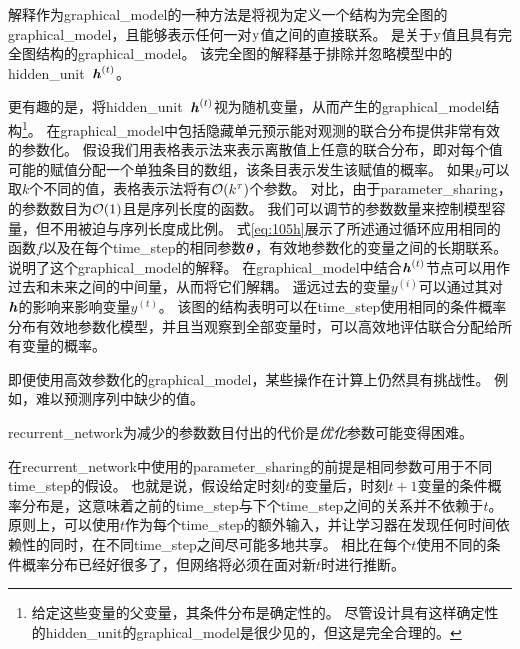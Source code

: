 解释作为\gls{graphical_model}的一种方法是将视为定义一个结构为完全图的\gls{graphical_model}，且能够表示任何一对$\mathrm{y}$值之间的直接联系。
是关于$\mathrm{y}$值且具有完全图结构的\gls{graphical_model}。
该完全图的解释基于排除并忽略模型中的\gls{hidden_unit}~$\boldsymbol{\mathit{h}}^{(t)}$。


更有趣的是，将\gls{hidden_unit}~$\boldsymbol{\mathit{h}}^{(t)}$视为随机变量，从而产生的\gls{graphical_model}结构\footnote{给定这些变量的父变量，其条件分布是确定性的。
尽管设计具有这样确定性的\gls{hidden_unit}的\gls{graphical_model}是很少见的，但这是完全合理的。}。
在\gls{graphical_model}中包括隐藏单元预示能对观测的联合分布提供非常有效的参数化。
假设我们用表格表示法来表示离散值上任意的联合分布，即对每个值可能的赋值分配一个单独条目的数组，该条目表示发生该赋值的概率。
如果$y$可以取$k$个不同的值，表格表示法将有$\mathcal{O}(k^\tau)$个参数。
对比，由于\gls{parameter_sharing}，的参数数目为$\mathcal{O}(1)$且是序列长度的函数。 %
我们可以调节的参数数量来控制模型容量，但不用被迫与序列长度成比例。
式\eqref{eq:105h}展示了所述通过循环应用相同的函数$f$以及在每个\gls{time_step}的相同参数$\boldsymbol{\theta}$，有效地参数化的变量之间的长期联系。
说明了这个\gls{graphical_model}的解释。
在\gls{graphical_model}中结合$\boldsymbol{\mathit{h}}^{(t)}$节点可以用作过去和未来之间的中间量，从而将它们解耦。
遥远过去的变量$y^{(i)}$可以通过其对$\boldsymbol{\mathit{h}}$的影响来影响变量$y^{(t)}$。
该图的结构表明可以在\gls{time_step}使用相同的条件概率分布有效地参数化模型，并且当观察到全部变量时，可以高效地评估联合分配给所有变量的概率。


即便使用高效参数化的\gls{graphical_model}，某些操作在计算上仍然具有挑战性。
例如，难以预测序列中缺少的值。

\gls{recurrent_network}为减少的参数数目付出的代价是\emph{优化}参数可能变得困难。

在\gls{recurrent_network}中使用的\gls{parameter_sharing}的前提是相同参数可用于不同\gls{time_step}的假设。
也就是说，假设给定时刻$t$的变量后，时刻$t +1$变量的条件概率分布是，这意味着之前的\gls{time_step}与下个\gls{time_step}之间的关系并不依赖于$t$。
原则上，可以使用$t$作为每个\gls{time_step}的额外输入，并让学习器在发现任何时间依赖性的同时，在不同\gls{time_step}之间尽可能多地共享。
相比在每个$t$使用不同的条件概率分布已经好很多了，但网络将必须在面对新$t$时进行推断。


